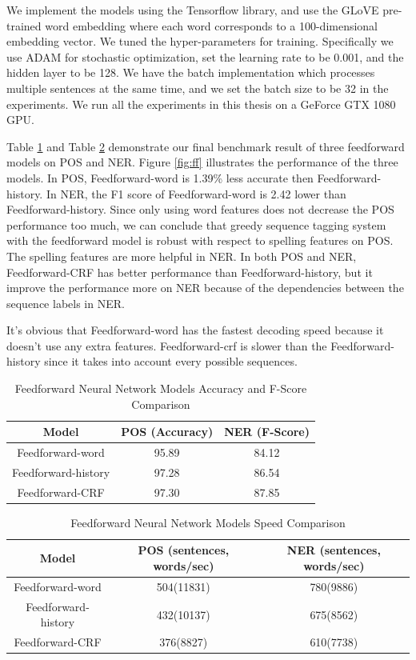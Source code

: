 \documentclass{sfuthesis}
\begin{document}
 
We implement the models using the Tensorflow library, and use the GLoVE pre-trained word embedding where each word corresponds to a 100-dimensional embedding vector. We tuned the hyper-parameters for training. Specifically we use ADAM for stochastic optimization, set the learning rate to be 0.001, and the hidden layer to be 128. We have the batch implementation which processes multiple sentences at the same time, and we set the batch size to be 32 in the experiments. We run all the experiments in this thesis on a GeForce GTX 1080 GPU. 

Table \ref{table:ff-table1} and Table \ref{table:ff-tabel2} demonstrate our final benchmark result of three feedforward models on POS and NER. Figure \ref{fig:ff} illustrates the performance of the three models. In POS, Feedforward-word is 1.39\% less accurate then Feedforward-history. In NER, the F1 score of Feedforward-word is 2.42 lower than Feedforward-history. Since only using word features does not decrease the POS performance too much, we can conclude that greedy sequence tagging system with the feedforward model is robust with respect to spelling features on POS. The spelling features are more helpful in NER. In both POS and NER, Feedforward-CRF has better performance than Feedforward-history, but it improve the performance more on NER because of the dependencies between the sequence labels in NER.

It's obvious that Feedforward-word has the fastest decoding speed because it doesn't use any extra features. Feedforward-crf is slower than the Feedforward-history since it takes into account every possible sequences.

\begin{table}[]
\centering
\caption{Feedforward Neural Network Models Accuracy and F-Score Comparison}
\label{table:ff-table1}
\begin{tabular}{|c|c|c|}
\hline
Model         & POS (Accuracy)  & NER (F-Score)       \\ \hline
Feedforward-word    & 95.89          &   84.12     \\ \hline
Feedforward-history & 97.28     & 86.54        \\ \hline
Feedforward-CRF     & 97.30          &   87.85     \\ \hline
\end{tabular}
\end{table}

\begin{table}[]
\centering
\caption{Feedforward Neural Network Models Speed Comparison}
\label{table:ff-tabel2}
\begin{tabular}{|c|c|c|}
\hline
Model       & POS  (sentences, words/sec)  & NER  (sentences, words/sec)      \\ \hline
Feedforward-word    & 504(11831)     & 780(9886)    \\ \hline
Feedforward-history & 432(10137)     & 675(8562)     \\ \hline
Feedforward-CRF    & 376(8827)     & 610(7738)     \\ \hline
\end{tabular}
\end{table}
\end{document}

